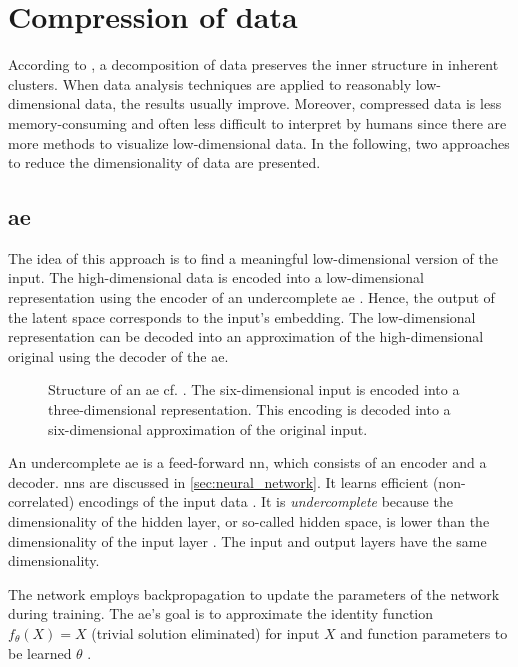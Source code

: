 \section{Compression of data}\label{sec:compression}

According to \citeauthor{clusteringDocs2020}, a decomposition of data preserves the inner structure in inherent clusters. 
When data analysis techniques are applied to reasonably low-dimensional data, the results usually improve.
Moreover, compressed data is less memory-consuming and often less difficult to interpret by humans 
since there are more methods to visualize low-dimensional data.
In the following, two approaches to reduce the dimensionality of data are presented.

\subsection{\acl*{ae}}\label{subsec:autoencoder}

The idea of this approach is to find a meaningful low-dimensional version of the input.
The high-dimensional data is encoded into a low-dimensional representation using the encoder of an undercomplete \ac{ae} \cite{autoencoder2020}.
Hence, the output of the latent space corresponds to the input's embedding. 
The low-dimensional representation can be decoded into an approximation of the high-dimensional original using the decoder of the \ac{ae}.

\begin{figure}[!htb] %
    \centering
    
    \caption[Structure of an \ac{ae}]
    {Structure of an \acs*{ae} cf. \cite{autoencoder2020}.
    The six-dimensional input is encoded into a three-dimensional representation.
    This encoding is decoded into a six-dimensional approximation of the original input.}
    \label{fig:ae}
\end{figure}

An undercomplete \ac{ae} is a feed-forward \ac{nn}, which consists of an encoder and a decoder.
\acp{nn} are discussed in \autoref{sec:neural_network}.
It learns efficient (non-correlated) encodings of the input data \cite{autoencoder2020}.
It is \textit{undercomplete} because the dimensionality of the hidden layer, or so-called hidden space, 
is lower than the dimensionality of the input layer \cite{seminar_ies}.
The input and output layers have the same dimensionality.

The network employs backpropagation to update the parameters of the network during training.
The \ac{ae}'s goal is to approximate the identity function $f_\theta(X) = X$ (trivial solution eliminated) for input $X$ and 
function parameters to be learned $\theta$ \cite{seminar_ies}.

